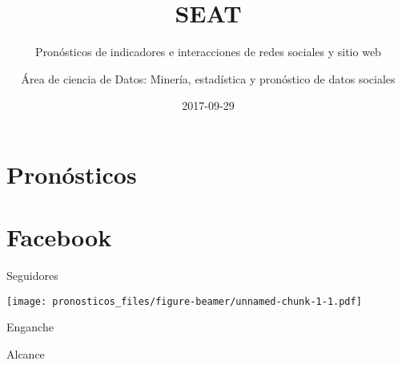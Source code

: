 \documentclass[ignorenonframetext,]{beamer}
\title{SEAT}
\subtitle{Pronósticos de indicadores e interacciones de redes sociales y sitio web}
\author{Área de ciencia de Datos: Minería, estadística y pronóstico de datos
sociales}
\date{2017-09-29}
\begin{document}
\frame{\titlepage}

\begin{frame}

\renewcommand{\figurename}{Figura}
\renewcommand{\tablename}{Tabla}




















\end{frame}

\section{Pronósticos}\label{pronosticos}

\section{Facebook}\label{facebook}

\begin{frame}[allowframebreaks]{Seguidores}

\texttt{[image: pronosticos\_files/figure-beamer/unnamed-chunk-1-1.pdf]}

\end{frame}

\begin{frame}{Enganche}

\end{frame}

\begin{frame}{Alcance}

\end{frame}
\end{document}
